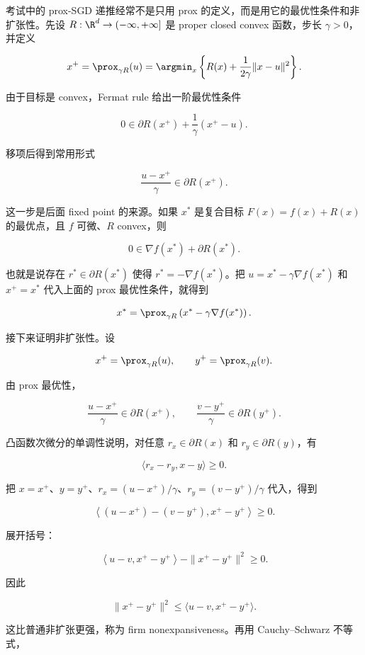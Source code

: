 
考试中的 prox-SGD 递推经常不是只用 prox 的定义，而是用它的最优性条件和非扩张性。先设 \(R:\R^d\to(-\infty,+\infty]\) 是 proper closed convex 函数，步长 \(\gamma>0\)，并定义

\[
  x^+
  =
  \prox_{\gamma R}(u)
  =
  \argmin_x
  \left\{
    R(x)+\frac{1}{2\gamma}\|x-u\|^2
  \right\}.
\]

由于目标是 convex，Fermat rule 给出一阶最优性条件

\[
  0
  \in
  \partial R(x^+)
  +
  \frac1\gamma(x^+-u).
\]

移项后得到常用形式

\[
  \frac{u-x^+}{\gamma}
  \in
  \partial R(x^+).
\]

这一步是后面 fixed point 的来源。如果 \(x^*\) 是复合目标 \(F(x)=f(x)+R(x)\) 的最优点，且 \(f\) 可微、\(R\) convex，则

\[
  0\in\nabla f(x^*)+\partial R(x^*).
\]

也就是说存在 \(r^*\in\partial R(x^*)\) 使得 \(r^*=-\nabla f(x^*)\)。把 \(u=x^*-\gamma\nabla f(x^*)\) 和 \(x^+=x^*\) 代入上面的 prox 最优性条件，就得到

\[
  x^*
  =
  \prox_{\gamma R}
  \left(x^*-\gamma\nabla f(x^*)\right).
\]

接下来证明非扩张性。设

\[
  x^+=\prox_{\gamma R}(u),
  \qquad
  y^+=\prox_{\gamma R}(v).
\]

由 prox 最优性，

\[
  \frac{u-x^+}{\gamma}\in\partial R(x^+),
  \qquad
  \frac{v-y^+}{\gamma}\in\partial R(y^+).
\]

凸函数次微分的单调性说明，对任意 \(r_x\in\partial R(x)\) 和 \(r_y\in\partial R(y)\)，有

\[
  \langle r_x-r_y,x-y\rangle\ge0.
\]

把 \(x=x^+\)、\(y=y^+\)、\(r_x=(u-x^+)/\gamma\)、\(r_y=(v-y^+)/\gamma\) 代入，得到

\[
  \left\langle
    (u-x^+)-(v-y^+),
    x^+-y^+
  \right\rangle
  \ge0.
\]

展开括号：

\[
  \left\langle
    u-v,
    x^+-y^+
  \right\rangle
  -
  \|x^+-y^+\|^2
  \ge0.
\]

因此

\[
  \|x^+-y^+\|^2
  \le
  \langle u-v,x^+-y^+\rangle.
\]

这比普通非扩张更强，称为 firm nonexpansiveness。再用 Cauchy--Schwarz 不等式，

